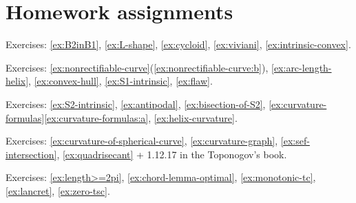 \chapter{Homework assignments}

Exercises: 
\ref{ex:B2inB1}, 
\ref{ex:L-shape}, 
\ref{ex:cycloid}, 
\ref{ex:viviani}, 
\ref{ex:intrinsic-convex}.

Exercises: 
\ref{ex:nonrectifiable-curve}(\ref{ex:nonrectifiable-curve:b}), 
\ref{ex:arc-length-helix}, 
\ref{ex:convex-hull},  
\ref{ex:S1-intrinsic},  
\ref{ex:flaw}.

Exercises:
\ref{ex:S2-intrinsic},
\ref{ex:antipodal},
\ref{ex:bisection-of-S2}, 
\ref{ex:curvature-formulas}\ref{ex:curvature-formulas:a},    
\ref{ex:helix-curvature}.


Exercises:
\ref{ex:curvature-of-spherical-curve},
\ref{ex:curvature-graph},
\ref{ex:sef-intersection},
\ref{ex:quadrisecant} 
+
1.12.17 in the Toponogov's book.

Exercises:
\ref{ex:length>=2pi},
\ref{ex:chord-lemma-optimal},
\ref{ex:monotonic-tc},
\ref{ex:lancret},
\ref{ex:zero-tsc}.
